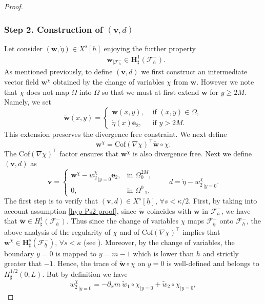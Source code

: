 \documentclass[11pt]{article}
\let\mathcal\mathscr
\theoremstyle{remark}
\theoremstyle{definition}
\newcommand{\vg}{\boldsymbol{v}}
\newcommand{\wg}{\boldsymbol{w}}
\newcommand{\BS}[1]{\boldsymbol{#1}}
\newcommand{\etap}{\dot{\eta}}
\newcommand{\hb}{{\underline{h}}}
\newcommand{\Cof}{\mathrm{Cof}}
\begin{document}
\begin{proof}
\subsubsection*{Step 2. Construction of $(\vg,d)$}
Let consider $(\wg,\etap) \in X^s[h]$ enjoying the further property
\begin{eqnarray}
&\wg_{\vert\mathcal{F}_{h}^{-}}\in \BS{H}^{1}_{\sharp}(\mathcal{F}^{-}_{h}).\label{hyp-Ps2-proof}
\end{eqnarray}
As mentioned previously, to define $(\vg,d)$ we first construct an intermediate vector field
$\wg^{\chi}$ obtained by the change of variables $\chi$ from $\wg$. However we note that
$\chi$ does not map $\Omega$ into $\Omega$ so that we must at first extend $\wg$ for
$y\geq 2 M$. Namely, we set
\[
\tilde{\wg}(x,y) =
\begin{cases}
\wg(x,y), & \text{ if $(x,y) \in \Omega$}, \\
\etap(x)\BS{e}_{2}, & \text{ if $y >2M$}.
\end{cases}
\]
This extension preserves the divergence free constraint.
We next define
\[\wg^\chi = \Cof(\nabla \chi)^{\top}\tilde{\wg}\circ \chi.\]
The $\Cof(\nabla \chi)^{\top}$ factor ensures that $\wg^\chi$ is also divergence free.
Next we define $(\vg,d)$ as
\begin{equation}\label{def.v.b}
\vg=\begin{cases}
\wg^\chi -{w_{2}^\chi}_{|{y=0}}\BS{e}_{2}, & \text{in } \Omega^{2M}_{0},\\
0, & \text{in }\Omega^{0}_{-1},
\end{cases}
\qquad
d=\etap -{w_{2}^\chi}_{|{y=0}}.
\end{equation}
The first step is to verify that $(\vg, d) \in X^s[\hb]$, $\forall s<\kappa/2$. First, by taking into account assumption \eqref{hyp-Ps2-proof}, since $\tilde{\wg}$ coincides with $\wg$ in $\mathcal F_{h}^{-}$, we have that $\tilde{\wg}\in H_\sharp^1(\mathcal F_{h}^{-})$. Thus since the change of variables $\chi$ maps $\mathcal{F}^-_{\hb}$ onto $\mathcal{F}^-_{h}$, the above analysis of the regularity of $\chi$ and of $ \Cof(\nabla \chi)^{\top}$ implies that $\wg^\chi\in \BS{H}^s_\sharp(\mathcal{F}^-_{\hb})$, $\forall s<\kappa$ (see \cite[Prop.\,B.1]{Grubsolo} ). Moreover, by the change of variables, the boundary $y=0$ is mapped to $y= m-1 $ which is lower than $h$ and strictly greater that $-1$. Hence, the trace of $\tilde{\wg} \circ \chi$ on $y=0$ is well-defined and belongs to $ H^{1/2}_{\sharp}(0,L)$.
But by definition we have
\[
{w_{2}^\chi}_{|{y=0}} = -\partial_x m \ \tilde{w}_{1}\circ\chi_{|{y=0}}+\tilde{w}_{2}\circ\chi_{|{y=0}},
\]
\end{proof}
\end{document}
